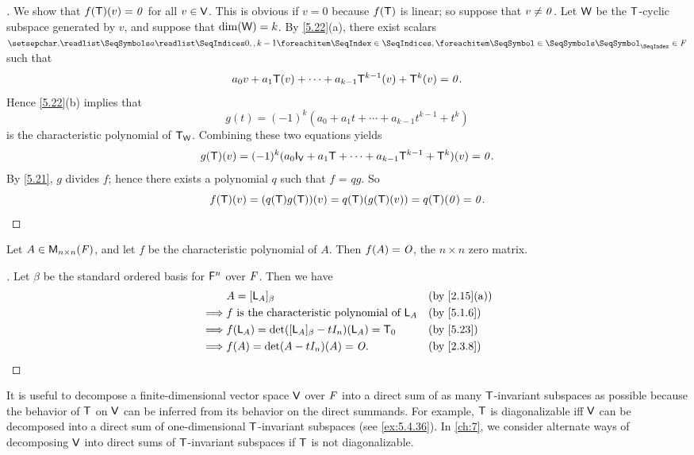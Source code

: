 \begin{proof}[]
  We show that \(f(\mathsf{T})(v) = \mathit{0}\) for all \(v \in \mathsf{V}\).
  This is obvious if \(v = 0\) because \(f(\mathsf{T})\) is linear;
  so suppose that \(v \neq \mathit{0}\).
  Let \(\mathsf{W}\) be the \(\mathsf{T}\)-cyclic subspace generated by \(v\), and suppose that \(\dim(\mathsf{W}) = k\).
  By \cref{5.22}(a), there exist scalars \(\seq{a}{0,,k-1} \in \F\) such that
  \[
    a_0 v + a_1 \mathsf{T}(v) + \cdots + a_{k - 1} \mathsf{T}^{k - 1}(v) + \mathsf{T}^k(v) = \mathit{0}.
  \]
  Hence \cref{5.22}(b) implies that
  \[
    g(t) = (-1)^k (a_0 + a_1 t + \cdots + a_{k - 1} t^{k - 1} + t^k)
  \]
  is the characteristic polynomial of \(\mathsf{T}_{\mathsf{W}}\).
  Combining these two equations yields
  \[
    g(\T)(v) = (-1)^k (a_0 \IT[\V] + a_1 \T + \cdots + a_{k - 1} \T^{k - 1} + \T^k)(v) = \zv.
  \]
  By \cref{5.21}, \(g\) divides \(f\);
  hence there exists a polynomial \(q\) such that \(f\) = \(qg\).
  So
  \[
    f(\mathsf{T})(v) = (q(\mathsf{T}) g(\mathsf{T}))(v) = q(\mathsf{T})(g(\mathsf{T})(v)) = q(\mathsf{T})(\mathit{0}) = \mathit{0}.
  \]
\end{proof}

\begin{cor}\label{5.4.4}
  Let \(A \in \mathsf{M}_{{n} \times n}({\mathit{F}})\), and let \(f\) be the characteristic polynomial of \(A\).
  Then \(f(A) = \mathit{O}\), the \(n \times n\) zero matrix.
\end{cor}

\begin{proof}[]
  Let \(\beta\) be the standard ordered basis for \(\mathsf{F}^n\) over \(\mathit{F}\).
  Then we have
  \begin{align*}
             & A = [\L_A]_{\beta}                                  &  & \text{(by \cref{2.15}(a))} \\
    \implies & f \text{ is the characteristic polynomial of } \L_A &  & \text{(by \cref{5.1.6})}   \\
    \implies & f(\L_A) = \det([\L_A]_{\beta} - t I_n)(\L_A) = \zT  &  & \text{(by \cref{5.23})}    \\
    \implies & f(A) = \det(A - t I_n)(A) = \zm.                    &  & \text{(by \cref{2.3.8})}
  \end{align*}
\end{proof}

\begin{note}
  It is useful to decompose a finite-dimensional vector space \(\mathsf{V}\) over \(\mathit{F}\) into a direct sum of as many \(\mathsf{T}\)-invariant subspaces as possible because the behavior of \(\mathsf{T}\) on \(\mathsf{V}\) can be inferred from its behavior on the direct summands.
  For example, \(\mathsf{T}\) is diagonalizable iff \(\mathsf{V}\) can be decomposed into a direct sum of one-dimensional \(\mathsf{T}\)-invariant subspaces (see \cref{ex:5.4.36}).
  In \cref{ch:7}, we consider alternate ways of decomposing \(\mathsf{V}\) into direct sums of \(\mathsf{T}\)-invariant subspaces if \(\mathsf{T}\) is not diagonalizable.
\end{note}

